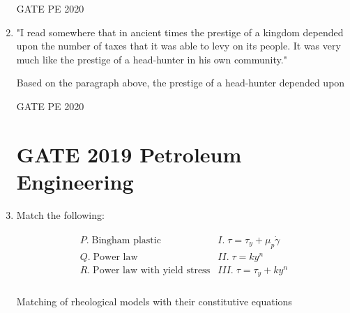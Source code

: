 \documentclass[journal,12pt,onecolumn]{IEEEtran}
\theoremstyle{remark}
\begin{document}
\begin{enumerate}
      \hfill{GATE PE 2020}
     
    \item "I read somewhere that in ancient times the prestige of a kingdom depended upon the number of taxes that it was able to levy on its people. It was very much like the prestige of a head-hunter in his own community."
    
    Based on the paragraph above, the prestige of a head-hunter depended upon 
    \begin{enumerate}  \end{enumerate}
    
      \hfill{GATE PE 2020}



\section*{GATE 2019 Petroleum Engineering}




\setcounter{enumi}{10} %

\item Match the following:

\begin{table}[h!]
\centering
\begin{align}
\begin{array}{ll}
P.\; \text{Bingham plastic}            & I.\; \tau = \tau_y + \mu_p \dot{\gamma} \\
Q.\; \text{Power law}                  & II.\; \tau = k y^n \\
R.\; \text{Power law with yield stress} & III.\; \tau = \tau_y + k y^n \\
\end{array}
\end{align}
\caption{Matching of rheological models with their constitutive equations}
\label{tab:rheology}
\end{table}



\end{enumerate}
\end{document}
